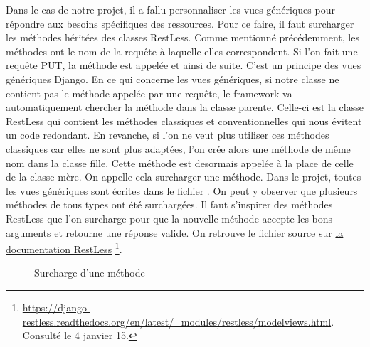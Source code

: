 \documentclass[a4paper,10pt,twoside]{sphinxmanual}
\begin{document}
Dans le cas de notre projet, il a fallu personnaliser les vues génériques pour répondre aux besoins spécifiques des ressources. Pour ce faire, il faut surcharger les méthodes héritées des classes RestLess. Comme mentionné précédemment, les méthodes ont le nom de la requête à laquelle elles correspondent. Si l'on fait une requête PUT, la méthode  est appelée et ainsi de suite. C'est un principe des vues génériques Django. En ce qui concerne les vues génériques, si notre classe ne contient pas le méthode appelée par une requête, le framework va automatiquement chercher la méthode dans la classe parente. Celle-ci est la classe RestLess qui contient les méthodes classiques et conventionnelles qui nous évitent un code redondant. En revanche, si l'on ne veut plus utiliser ces méthodes classiques car elles ne sont plus adaptées, l'on crée alors une méthode de même nom dans la classe fille. Cette méthode est desormais appelée à la place de celle de la classe mère. On appelle cela surcharger une méthode. Dans le projet, toutes les vues génériques sont écrites dans le fichier . On peut y observer que plusieurs méthodes de tous types ont été surchargées. Il faut s'inspirer des méthodes RestLess que l'on surcharge pour que la nouvelle méthode accepte les bons arguments et retourne une réponse valide. On retrouve le fichier source sur \href{https://django-restless.readthedocs.org/en/latest/\_modules/restless/modelviews.html}{la documentation RestLess} \footnote{
\href{https://django-restless.readthedocs.org/en/latest/\_modules/restless/modelviews.html}{https://django-restless.readthedocs.org/en/latest/\_modules/restless/modelviews.html}. Consulté le 4 janvier 15.
}.
\begin{figure}[htbp]
\centering
\capstart

\caption{Surcharge d'une méthode}\end{figure}
\end{document}
